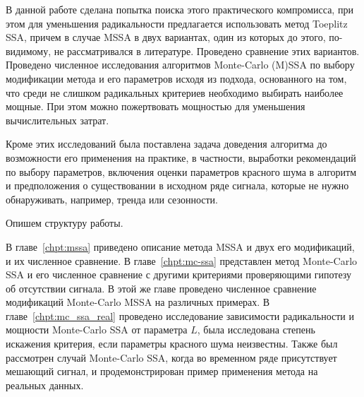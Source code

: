 \documentclass[specialist,
substylefile = spbu_report.rtx,
subf,href,colorlinks=true, 12pt]{disser}
\theoremstyle{definition}
\begin{document}
 
 В данной работе сделана попытка поиска этого практического компромисса, при этом для уменьшения радикальности предлагается использовать метод Toeplitz SSA, причем в случае MSSA в двух вариантах, один из которых до этого, по-видимому, не рассматривался в литературе.
 Проведено сравнение этих вариантов.
 Проведено численное исследования алгоритмов Monte-Carlo (M)SSA по выбору модификации метода и его параметров исходя из подхода, основанного на том, что среди не слишком радикальных критериев необходимо выбирать наиболее мощные. При этом можно пожертвовать мощностью для уменьшения вычислительных затрат. 
 
 Кроме этих исследований была поставлена задача доведения алгоритма до возможности его применения на практике, в частности, выработки рекомендаций по выбору параметров, включения оценки параметров красного шума в алгоритм и предположения о существовании в исходном ряде сигнала, которые не нужно обнаруживать, например, тренда или сезонности.
%

Опишем структуру работы.

В главе~\ref{chpt:mssa} приведено описание метода MSSA и двух его модификаций, и их численное сравнение. В главе~\ref{chpt:mc-ssa} представлен метод Monte-Carlo SSA и его численное сравнение с другими критериями проверяющими гипотезу об отсутствии сигнала. В этой же главе проведено численное сравнение модификаций Monte-Carlo MSSA на различных примерах. В главе~\ref{chpt:mc_ssa_real} проведено исследование зависимости радикальности и мощности Monte-Carlo SSA от параметра $L$, была исследована степень искажения критерия, если параметры красного шума неизвестны. Также был рассмотрен случай Monte-Carlo SSA, когда во временном ряде присутствует мешающий сигнал, и продемонстрирован пример применения метода на реальных данных.
\end{document}
